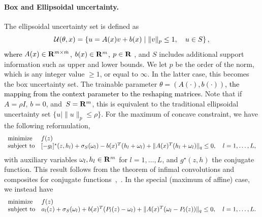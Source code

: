 \documentclass[11pt]{article}
\newcommand{\bsnote}[1]{\noindent\textcolor{red}{\texttt{Bartolomeo: #1}}}
\newcommand{\RC}[1]{\textcolor{black}{#1}}
\begin{document}
\begin{appendices}
\paragraph{Box and Ellipsoidal uncertainty.}
The ellipsoidal uncertainty set is defined as
\RC{$$ {\mathcal{U}}(\theta,x) = \left\{u = A(x)v+b(x) \mid \| v\|_p \leq 1,\quad u \in S\right\},$$
where $A(x)\in {\mathbf R}^{m\times \hat{m}}$, $b(x)\in {\mathbf R}^{m}$, $p \in {\mathbf R}$}
, and $S$ includes additional support information such as upper and lower bounds. We let $p$ be the order of the norm, which is any integer value $\geq 1$, or equal to $\infty$. In the latter case, this becomes the box uncertainty set. The trainable parameter \RC{$\theta = (A(\cdot),b(\cdot))$, the mapping from the context parameter to the reshaping matrices.} Note that if $A = \rho I$, $b = 0$, and~$S = {\mathbf R}^m$, this is equivalent to the traditional ellipsoidal uncertainty set ${ \{ u \mid\| u\|_p \leq \rho \}}$. 
For the maximum of concave constraint, we have the following reformulation,
\begin{equation*}
	\begin{array}{ll}
	\text{minimize} & f(z)\\
	\mbox{subject to} & [-g_l]^\star(z,h_l)+ \sigma_S(\omega_l)  -b\RC{(x)}^T(h_l + \omega_l) + \|A\RC{(x)}^T(h_l + \omega_l) \|_q \leq 0, \quad l = 1,\dots,L,
	\end{array}
	\end{equation*}
with auxiliary variables $\omega_l, h_l \in {\mathbf R}^m$ for $l = 1,\dots,L$, and $g^\star(z,h)$ the conjugate function. This result follows from the theorem of infimal convolutions and composites for conjugate functions~\citep{rockafellar_wets_1998},~\citep{composites}. In the special (maximum of affine) case, we instead have
\begin{equation*}
	\label{eq:ellip_max}
	\begin{array}{ll}
		\mbox{minimize} & f(z)\\
		\mbox{subject to} & a_l(z) + \sigma_S(\omega_l)+ b\RC{(x)}^T(P_l(z) - \omega_l) +  \|A\RC{(x)}^T(\omega_l -P_l(z))\|_q \le 0, \quad l = 1,\dots,L.	\end{array}
\end{equation*}


\end{appendices}
\end{document}
